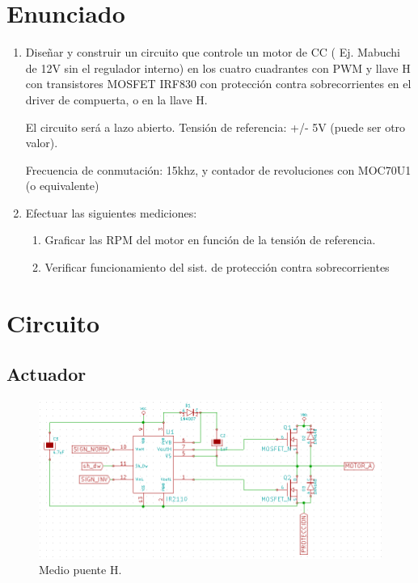 \documentclass[11pt, a4paper]{article}
\begin{document}
\section{Enunciado}
\begin{enumerate}
	\item Diseñar y construir un circuito que controle un motor de CC ( Ej. Mabuchi de 12V sin el regulador interno) en los cuatro cuadrantes con PWM y llave H con transistores MOSFET IRF830 con protección contra sobrecorrientes en el driver de compuerta, o en la llave H.
	
	El circuito será a lazo abierto. Tensión de referencia: +/- 5V (puede ser otro valor).
	
	Frecuencia de conmutación: 15khz, y contador de revoluciones con MOC70U1 (o equivalente)

	\item Efectuar las siguientes mediciones:
	\begin{enumerate}
		\item Graficar las RPM del motor en función de la tensión de referencia.
		\item Verificar funcionamiento del sist. de protección contra sobrecorrientes
	\end{enumerate}
\end{enumerate}

\section{Circuito}
\subsection{Actuador}


\begin{figure}[h]
	\centering
	\includegraphics[width=13cm]{Imagenes/circ_driver.png}
	\caption{Medio puente H.}
	\label{fig:circ_driver}
\end{figure} 
\end{document}
